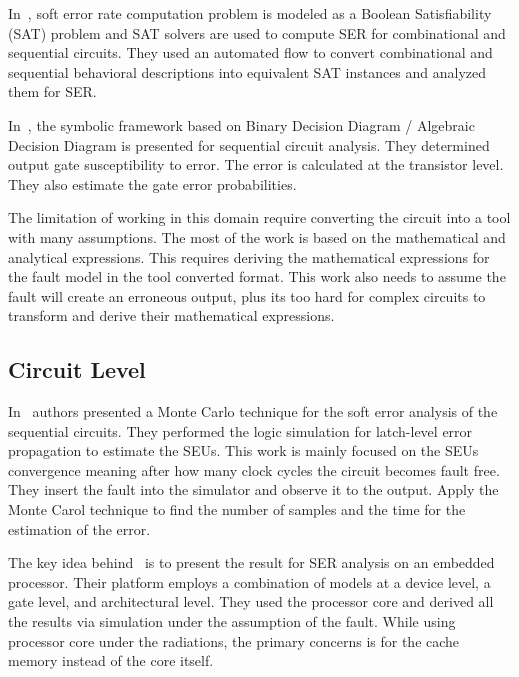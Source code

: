 In~\citep{shazli2011high}, soft error rate  computation problem is modeled as a Boolean
Satisfiability (SAT) problem and SAT solvers are used to compute SER for combinational and
sequential circuits. They used an automated flow to convert combinational and sequential behavioral
descriptions into equivalent SAT instances and analyzed them for SER.



In~\citep{miskov2007mars}, the symbolic framework based on Binary Decision Diagram / Algebraic Decision
Diagram is presented for sequential circuit analysis. They determined output gate susceptibility to error. The error is calculated at the transistor level. They also estimate the gate error probabilities.


The limitation of working in this domain require converting the circuit into a tool with many assumptions. The most of the work is based on the mathematical and analytical expressions. This requires deriving the mathematical expressions for the fault model in the tool converted format. This work also needs to assume the fault will create an erroneous output, plus its too hard for complex circuits to transform and derive their mathematical expressions.


\subsection{Circuit Level}


In~\citep{li2016monte} authors presented a  Monte Carlo technique for the soft error analysis of the sequential
circuits. They performed the logic simulation for latch-level error propagation to estimate the SEUs. This work is mainly focused on the SEUs convergence meaning after how many clock cycles the circuit becomes fault free.
They insert the fault into the simulator and observe it to the output. Apply the Monte Carol technique
to find the number of samples and the time for the estimation of the error.
  
  

The key idea behind~\citep{ebrahimi2015comprehensive} is to present the result for SER analysis on an embedded
processor. Their platform employs a combination of models at a device level, a gate level, and architectural level. They used the
processor core and derived all the results via simulation under the assumption of the fault. While using processor core under the radiations, the primary concerns is for the cache memory instead
of the core itself.


